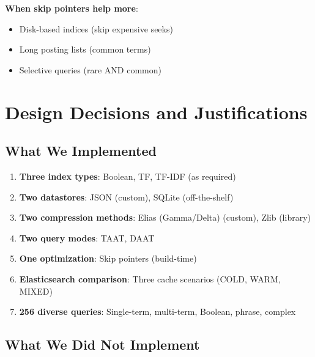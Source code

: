 \documentclass[12pt,a4paper]{article}
\begin{document}
\textbf{When skip pointers help more}:
\begin{itemize}
    \item Disk-based indices (skip expensive seeks)
    \item Long posting lists (common terms)
    \item Selective queries (rare AND common)
\end{itemize}

\section{Design Decisions and Justifications}

\subsection{What We Implemented}

\begin{enumerate}
    \item \textbf{Three index types}: Boolean, TF, TF-IDF (as required)
    \item \textbf{Two datastores}: JSON (custom), SQLite (off-the-shelf)
    \item \textbf{Two compression methods}: Elias (Gamma/Delta) (custom), Zlib (library)
    \item \textbf{Two query modes}: TAAT, DAAT
    \item \textbf{One optimization}: Skip pointers (build-time)
    \item \textbf{Elasticsearch comparison}: Three cache scenarios (COLD, WARM, MIXED)
    \item \textbf{256 diverse queries}: Single-term, multi-term, Boolean, phrase, complex
\end{enumerate}

\subsection{What We Did Not Implement}
\end{document}
